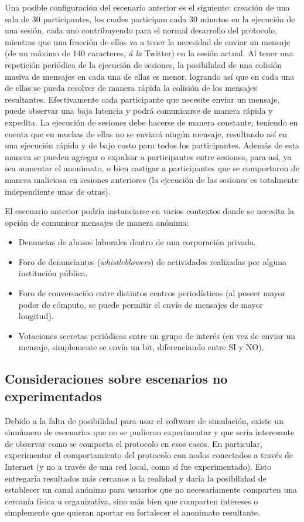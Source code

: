 Una posible configuración del escenario anterior es el siguiente: creación de 
una sala de 30 participantes, los cuales participan cada 30 minutos en la 
ejecución de una sesión, cada uno contribuyendo para el normal desarrollo del 
protocolo, mientras que una fracción de ellos va a tener la necesidad de 
enviar un mensaje (de un máximo de 140 caracteres, \emph{á la} Twitter) en la 
sesión actual. Al tener una repetición periódica de la ejecución de sesiones, 
la posibilidad de una colisión masiva de mensajes en cada una de ellas es 
menor, logrando así que en cada una de ellas se pueda resolver de manera rápida la 
colisión de los mensajes resultantes. Efectivamente cada participante que 
necesite enviar un mensaje, puede observar una baja latencia y podrá 
comunicarse de manera rápida y expedita. La ejecución de sesiones 
debe hacerse de manera constante, teniendo en cuenta que en muchas de ellas no se 
enviará ningún mensaje, resultando así en una ejecución rápida y de bajo costo 
para todos los participantes. Además de esta manera se pueden agregar o 
expulsar a participantes entre sesiones, para así, ya sea aumentar el 
anonimato, o bien castigar a participantes que se comportaron de manera 
maliciosa en sesiones anteriores (la ejecución de las sesiones es totalmente 
independiente unas de otras).

El escenario anterior podría instanciarse en varios contextos donde se 
necesita la opción de comunicar mensajes de manera anónima:
\begin{itemize}
	\item Denuncias de abusos laborales dentro de una corporación privada.
	\item Foro de denunciantes (\emph{whistleblowers}) de actividades 
	realizadas por alguna institución pública.
	\item Foro de conversación entre distintos centros periodísticos (al 
	poseer mayor poder de cómputo, se puede permitir el envío de mensajes de 
	mayor longitud).
	\item Votaciones secretas periódicas entre un grupo de interés (en vez de 
	enviar un mensaje, 
	simplemente se envía un bit, diferenciando entre SI y NO).
\end{itemize} 

\subsection{Consideraciones sobre escenarios no experimentados}

Debido a la falta de posibilidad para usar el software de simulación, existe un 
sinnúmero de escenarios que no se pudieron experimentar y que sería interesante 
de observar como se comporta el protocolo en esos casos. En particular, 
experimentar el comportamiento del protocolo con nodos conectados a través de 
Internet (y no a través de una red local, como sí fue experimentado). Esto 
entregaría resultados más cercanos a la realidad y daría la posibilidad 
de establecer un canal anónimo para usuarios que no necesariamente comparten 
una cercanía física u organizativa, sino más bien que comparten intereses 
o simplemente que quieran aportar en fortalecer el anonimato resultante.

